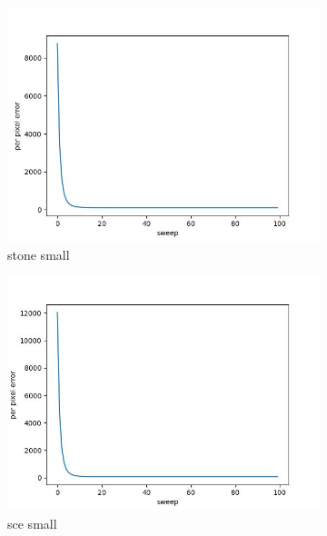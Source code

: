 \documentclass[11pt]{article}
\begin{document}
\begin{figure}[ht!]
    \centering
    \hfill%
    \begin{subfigure}[]{0.333\linewidth}
        \centering
        \includegraphics[width=\linewidth]{fig/loss/stone_small_loss.jpg}
        \caption{stone small}
    \end{subfigure}%
    \hfill%
    \begin{subfigure}[]{0.333\linewidth}
        \centering
        \includegraphics[width=\linewidth]{fig/loss/sce_small_loss.jpg}
        \caption{sce small}
    \end{subfigure}%
    \hfill%
    \begin{subfigure}[]{0.333\linewidth}
        \centering

\end{subfigure}
\end{figure}
\end{document}
